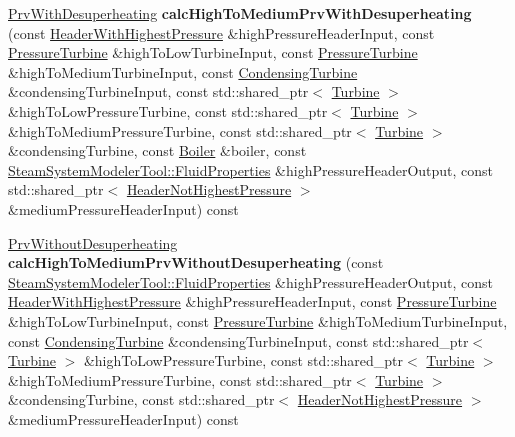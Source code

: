 \begin{DoxyCompactItemize}
\item 
\mbox{\label{class_prv_calculator_a07b64cdc95d9a7fd980bdd586654ca22}} 
\hyperlink{class_prv_with_desuperheating}{Prv\+With\+Desuperheating} {\bfseries calc\+High\+To\+Medium\+Prv\+With\+Desuperheating} (const \hyperlink{class_header_with_highest_pressure}{Header\+With\+Highest\+Pressure} \&high\+Pressure\+Header\+Input, const \hyperlink{class_pressure_turbine}{Pressure\+Turbine} \&high\+To\+Low\+Turbine\+Input, const \hyperlink{class_pressure_turbine}{Pressure\+Turbine} \&high\+To\+Medium\+Turbine\+Input, const \hyperlink{class_condensing_turbine}{Condensing\+Turbine} \&condensing\+Turbine\+Input, const std\+::shared\+\_\+ptr$<$ \hyperlink{class_turbine}{Turbine} $>$ \&high\+To\+Low\+Pressure\+Turbine, const std\+::shared\+\_\+ptr$<$ \hyperlink{class_turbine}{Turbine} $>$ \&high\+To\+Medium\+Pressure\+Turbine, const std\+::shared\+\_\+ptr$<$ \hyperlink{class_turbine}{Turbine} $>$ \&condensing\+Turbine, const \hyperlink{class_boiler}{Boiler} \&boiler, const \hyperlink{struct_steam_system_modeler_tool_1_1_fluid_properties}{Steam\+System\+Modeler\+Tool\+::\+Fluid\+Properties} \&high\+Pressure\+Header\+Output, const std\+::shared\+\_\+ptr$<$ \hyperlink{class_header_not_highest_pressure}{Header\+Not\+Highest\+Pressure} $>$ \&medium\+Pressure\+Header\+Input) const
\item 
\mbox{\label{class_prv_calculator_a42c579ff96593bab8109610d557718c0}} 
\hyperlink{class_prv_without_desuperheating}{Prv\+Without\+Desuperheating} {\bfseries calc\+High\+To\+Medium\+Prv\+Without\+Desuperheating} (const \hyperlink{struct_steam_system_modeler_tool_1_1_fluid_properties}{Steam\+System\+Modeler\+Tool\+::\+Fluid\+Properties} \&high\+Pressure\+Header\+Output, const \hyperlink{class_header_with_highest_pressure}{Header\+With\+Highest\+Pressure} \&high\+Pressure\+Header\+Input, const \hyperlink{class_pressure_turbine}{Pressure\+Turbine} \&high\+To\+Low\+Turbine\+Input, const \hyperlink{class_pressure_turbine}{Pressure\+Turbine} \&high\+To\+Medium\+Turbine\+Input, const \hyperlink{class_condensing_turbine}{Condensing\+Turbine} \&condensing\+Turbine\+Input, const std\+::shared\+\_\+ptr$<$ \hyperlink{class_turbine}{Turbine} $>$ \&high\+To\+Low\+Pressure\+Turbine, const std\+::shared\+\_\+ptr$<$ \hyperlink{class_turbine}{Turbine} $>$ \&high\+To\+Medium\+Pressure\+Turbine, const std\+::shared\+\_\+ptr$<$ \hyperlink{class_turbine}{Turbine} $>$ \&condensing\+Turbine, const std\+::shared\+\_\+ptr$<$ \hyperlink{class_header_not_highest_pressure}{Header\+Not\+Highest\+Pressure} $>$ \&medium\+Pressure\+Header\+Input) const
\end{DoxyCompactItemize}


